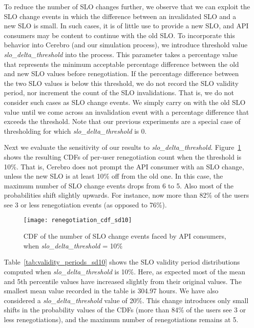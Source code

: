 To reduce the number of SLO changes further, we observe that we can exploit the
SLO change events in which the difference between an invalidated SLO
and a new SLO is small. In such cases, it is of little use to provide 
a new SLO, and API consumers may be content to continue with the old SLO.
To incorporate this behavior into Cerebro (and our simulation process), we introduce threshold
value \textit{slo\_delta\_threshold} into the process. This parameter takes a percentage value that
represents the minimum acceptable percentage difference between the old and new SLO
values before renegotiation.
If the percentage difference between the two SLO values is below this threshold, we do not record the
SLO validity period, nor increment the count of the SLO invalidations. That is, we do not consider
such cases as SLO change events. We simply carry on with the
old SLO value until we come across an invalidation event with a percentage difference
that exceeds the threshold. 
Note that our previous experiments are 
a special case of thresholding for which \textit{slo\_delta\_threshold} is 0.

Next we evaluate the sensitivity of our results to \textit{slo\_delta\_threshold}.
Figure~\ref{fig:renegotiation_cdf_sd10}
shows the resulting CDFs of per-user renegotiation count when the threshold is 10\%. 
That is, Cerebro does not prompt the API consumer with an SLO change, unless the new SLO is at 
least 10\% off from the old one. In this case, the
maximum number of SLO change events drops from 6 to 5.
Also most of the probabilities shift slightly upwards. For instance,
now more than 82\% of the users see 3 or less renegotiation events (as opposed to 76\%).

\begin{figure}
\centering
\texttt{[image: renegotiation\_cdf\_sd10]}
\caption{CDF of the number of SLO change events faced by API consumers, when  \textit{slo\_delta\_threshold} = 10\%}
\label{fig:renegotiation_cdf_sd10}
\end{figure}

Table~\ref{tab:validity_periods_sd10} shows the SLO validity period distributions computed
when  \textit{slo\_delta\_threshold} is 10\%. Here, as expected  most of the mean and 5th
percentile values have increased slightly from their original values. The smallest mean value
recorded in the table is 304.97 hours. 
We have also considered a \textit{slo\_delta\_threshold} value of 20\%. This change
introduces only small shifts in the probability values of 
the CDFs (more than 84\% of the users see 3 or less renegotiations), 
and the maximum number of renegotiations remains at 5.

